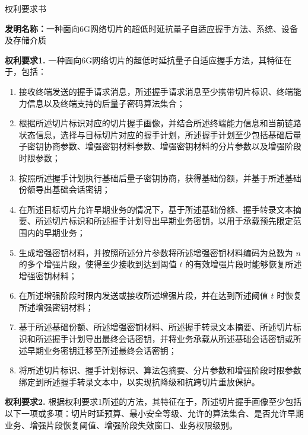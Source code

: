 \documentclass[12pt,a4paper]{article}
\begin{document}
\begin{center}
    {\Huge\heiti 权利要求书}
\end{center}

\vspace{1em}

\noindent\textbf{发明名称：}一种面向6G网络切片的超低时延抗量子自适应握手方法、系统、设备及存储介质

\vspace{1em}

\textbf{权利要求1.} 一种面向6G网络切片的超低时延抗量子自适应握手方法，其特征在于，包括：

\begin{enumerate}[label=\arabic*., leftmargin=2em]
    \item 接收终端发送的握手请求消息，所述握手请求消息至少携带切片标识、终端能力信息以及终端支持的后量子密码算法集合；
    \item 根据所述切片标识对应的切片握手画像，并结合所述终端能力信息和当前链路状态信息，选择与目标切片对应的握手计划，所述握手计划至少包括基础后量子密钥协商参数、增强密钥材料参数、增强密钥材料的分片参数以及增强阶段时限参数；
    \item 按照所述握手计划执行基础后量子密钥协商，获得基础份额，并基于所述基础份额导出基础会话密钥；
    \item 在所述目标切片允许早期业务的情况下，基于所述基础份额、握手转录文本摘要、所述切片标识和所述握手计划导出早期业务密钥，以用于承载预先限定范围内的早期业务；
    \item 生成增强密钥材料，并按照所述分片参数将所述增强密钥材料编码为总数为 $n$ 的多个增强片段，使得至少接收到达到阈值 $t$ 的有效增强片段时能够恢复所述增强密钥材料；
    \item 在所述增强阶段时限内发送或接收所述增强片段，并在达到所述阈值 $t$ 时恢复所述增强密钥材料；
    \item 基于所述基础份额、所述增强密钥材料、所述握手转录文本摘要、所述切片标识和所述握手计划导出最终会话密钥，并将业务承载从所述基础会话密钥或所述早期业务密钥迁移至所述最终会话密钥；
    \item 将所述切片标识、握手计划标识、算法包摘要、分片参数和增强阶段时限参数绑定到所述握手转录文本中，以实现抗降级和抗跨切片重放保护。
\end{enumerate}

\vspace{0.5cm}

\textbf{权利要求2.} 根据权利要求1所述的方法，其特征在于，所述切片握手画像至少包括以下一项或多项：切片时延预算、最小安全等级、允许的算法集合、是否允许早期业务、增强片段恢复阈值、增强阶段失效窗口、业务权限级别。
\end{document}
